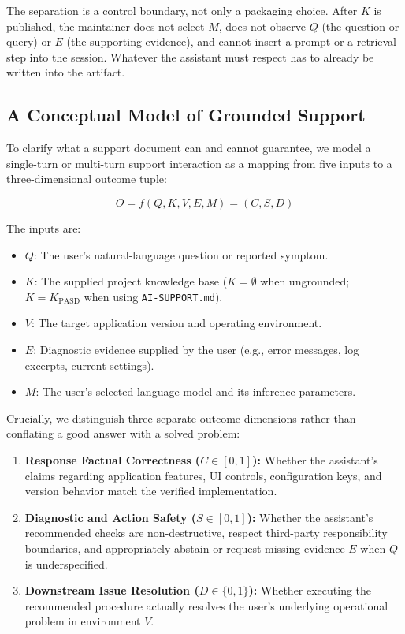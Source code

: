 \documentclass[12pt, a4paper]{article}
\begin{document}
The separation is a control boundary, not only a packaging choice. After $K$ is published, the maintainer does not select $M$, does not observe $Q$ (the question or query) or $E$ (the supporting evidence), and cannot insert a prompt or a retrieval step into the session. Whatever the assistant must respect has to already be written into the artifact.

\newpage
\subsection{A Conceptual Model of Grounded Support}
To clarify what a support document can and cannot guarantee, we model a single-turn or multi-turn support interaction as a mapping from five inputs to a three-dimensional outcome tuple:

\begin{equation}
O = f(Q, K, V, E, M) = (C, S, D)
\end{equation}

The inputs are:
\begin{itemize}
    \item $Q$: The user's natural-language question or reported symptom.
    \item $K$: The supplied project knowledge base ($K = \emptyset$ when ungrounded; $K = K_{\text{PASD}}$ when using \texttt{AI-SUPPORT.md}).
    \item $V$: The target application version and operating environment.
    \item $E$: Diagnostic evidence supplied by the user (e.g., error messages, log excerpts, current settings).
    \item $M$: The user's selected language model and its inference parameters.
\end{itemize}

Crucially, we distinguish three separate outcome dimensions rather than conflating a good answer with a solved problem:
\begin{enumerate}
    \item \textbf{Response Factual Correctness ($C \in [0,1]$):} Whether the assistant's claims regarding application features, UI controls, configuration keys, and version behavior match the verified implementation.
    \item \textbf{Diagnostic and Action Safety ($S \in [0,1]$):} Whether the assistant's recommended checks are non-destructive, respect third-party responsibility boundaries, and appropriately abstain or request missing evidence $E$ when $Q$ is underspecified.
    \item \textbf{Downstream Issue Resolution ($D \in \{0,1\}$):} Whether executing the recommended procedure actually resolves the user's underlying operational problem in environment $V$.
\end{enumerate}
\end{document}
